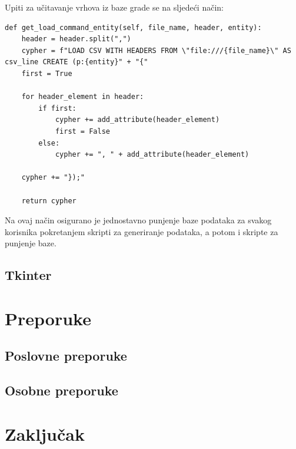 \documentclass[titlepage, 12pt]{scrartcl}
\begin{document}
Upiti za učitavanje vrhova iz baze grade se na sljedeći način:
\begin{verbatim}
def get_load_command_entity(self, file_name, header, entity):
    header = header.split(",")
    cypher = f"LOAD CSV WITH HEADERS FROM \"file:///{file_name}\" AS csv_line CREATE (p:{entity}" + "{"
    first = True

    for header_element in header:
        if first:
            cypher += add_attribute(header_element)
            first = False
        else:
            cypher += ", " + add_attribute(header_element)

    cypher += "});"

    return cypher
\end{verbatim}
Na ovaj način osigurano je jednostavno punjenje baze podataka za svakog korisnika pokretanjem skripti za generiranje podataka, a potom i skripte za punjenje baze.
\subsection{Tkinter}
\newpage

\section{Preporuke}
\subsection{Poslovne preporuke}
\subsection{Osobne preporuke}

\newpage
\section{Zaključak}
\end{document}

